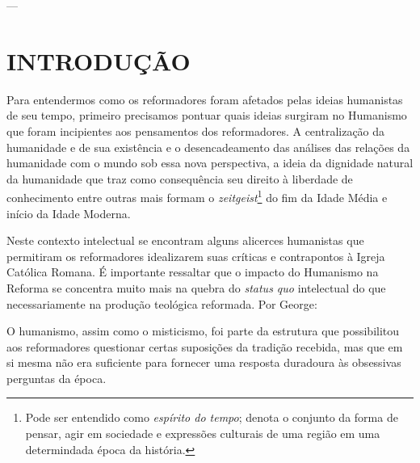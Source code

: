 \documentclass[
    article,            %
	12pt,				%
	oneside,			%
	a4paper,			%
	english,			%
	french,				%
	spanish,			%
	brazil				%
	]{abntex2}
\begin{document}



\imprimircapa

\imprimirfolhaderosto

---
\tableofcontents*
\cleardoublepage

\textual



\section{INTRODUÇÃO}
Para entendermos como os reformadores foram afetados pelas ideias humanistas de seu tempo, primeiro precisamos pontuar quais ideias surgiram no Humanismo que foram incipientes aos pensamentos dos reformadores. A centralização da humanidade e de sua existência e o desencadeamento das análises das relações da humanidade com o mundo sob essa nova perspectiva, a ideia da dignidade natural da humanidade que traz como consequência seu direito à liberdade de conhecimento entre outras mais formam o \emph{zeitgeist}\footnote{Pode ser entendido como \emph{espírito do tempo}; denota o conjunto da forma de pensar, agir em sociedade e expressões culturais de uma região em uma determindada época da história.} do fim da Idade Média e início da Idade Moderna.

Neste contexto intelectual se encontram alguns alicerces humanistas que permitiram os reformadores idealizarem suas críticas e contrapontos à Igreja Católica Romana. É importante ressaltar que o impacto do Humanismo na Reforma se concentra muito mais na quebra do \emph{status quo} intelectual do que necessariamente na produção teológica reformada. Por George:
\begin{citacao}
O humanismo, assim como o misticismo, foi parte da estrutura que possibilitou aos reformadores questionar certas suposições da tradição recebida, mas que em si mesma não era suficiente para fornecer uma resposta duradoura às obsessivas perguntas da época. \cite[p.49]{GEORGE}
\end{citacao}
\end{document}
